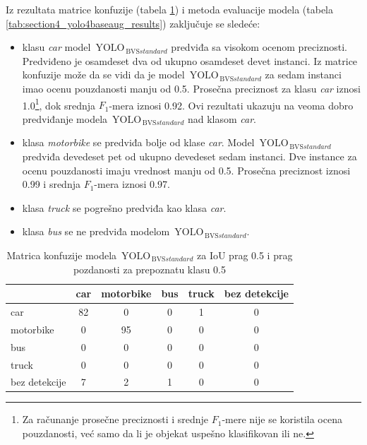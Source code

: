 \documentclass[12pt,oneside]{memoir}
\newcommand{\yolo}{\ensuremath{\,\textrm{YOLO}}}
\newcommand{\bvs}{\ensuremath{\,\textrm{BVS}}}
\begin{document}
Iz rezultata matrice konfuzije (tabela \ref{tab:section4_yolo4baseaug_confusionmatrix}) i metoda evaluacije modela (tabela \ref{tab:section4_yolo4baseaug_results}) zaključuje se sledeće:
\begin{itemize}
    \item klasu \textit{car} model  $\yolo_{\bvs{standard}}$ predviđa sa visokom ocenom preciznosti. Predviđeno je osamdeset dva od ukupno osamdeset devet instanci. Iz matrice konfuzije može da se vidi da je model  $\yolo_{\bvs{standard}}$ za sedam instanci imao ocenu pouzdanosti manju od 0.5. Prosečna preciznost za klasu \textit{car} iznosi 1.0\footnote{Za računanje prosečne preciznosti i srednje $F_1$-mere nije se koristila ocena pouzdanosti, već samo da li je objekat uspešno klasifikovan ili ne.}, dok srednja $F_1$-mera iznosi 0.92. Ovi rezultati ukazuju na veoma dobro predviđanje modela  $\yolo_{\bvs{standard}}$ nad klasom \textit{car}.
    \item klasa \textit{motorbike} se predviđa bolje od klase \textit{car}. Model  $\yolo_{\bvs{standard}}$ predviđa devedeset pet od ukupno devedeset sedam instanci. Dve instance za ocenu pouzdanosti imaju vrednost manju od 0.5. Prosečna preciznost iznosi 0.99 i srednja $F_1$-mera iznosi 0.97.
    \item klasa \textit{truck} se pogrešno predviđa kao klasa \textit{car}. 
    \item  klasa \textit{bus} se ne predviđa modelom  $\yolo_{\bvs{standard}}$.
\end{itemize}



\begin{table}
    \begin{center}
    \caption{Matrica konfuzije modela $\yolo_{\bvs{standard}}$ za IoU prag 0.5 i prag pozdanosti za prepoznatu klasu 0.5 }
    \begin{tabular}{ l|c|c|c|c|c|}
                  & car  & motorbike & bus & truck & bez detekcije \\ \hline
    car           & 82   & 0         & 0   & 1     & 0             \\ 
    motorbike     & 0    & 95        & 0   & 0     & 0             \\ 
    bus           & 0    & 0         & 0   & 0     & 0             \\ 
    truck         & 0    & 0         & 0   & 0     & 0             \\ 
    bez detekcije & 7    & 2         & 1   & 0     & 0             \\ \hline
    \hline
    \end{tabular}
    \label{tab:section4_yolo4baseaug_confusionmatrix}
    \end{center}
\end{table}
\end{document}

